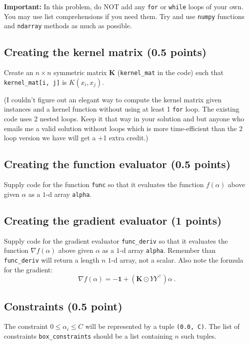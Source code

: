 \documentclass{article}
\begin{document}
{\bf Important:} In this problem, do NOT add any {\tt for} or {\tt while} loops of your own. You may use list comprehensions if you need them.
Try and use {\tt numpy} functions and {\tt ndarray} methods as much as possible.

\subsection{Creating the kernel matrix (0.5 points)}
Create an $n \times n$ symmetric matrix $\mathbf{K}$ ({\tt kernel\_mat} in the code) such that {\tt kernel\_mat[i, j]} is $K(x_i, x_j)$.

(I couldn't figure out an elegant way to compute the kernel matrix given instances and a kernel function without using at least 1 {\tt for}
loop. The existing code uses 2 nested loops. Keep it that way in your solution and but anyone who emails me a
valid solution without loops which is more time-efficient than the 2 loop version we have will get a +1 extra credit.)

\subsection{Creating the function evaluator (0.5 points)}

Supply code for the function {\tt func} so that it evaluates the function $f(\alpha)$ above given $\alpha$ as a $1$-d array {\tt alpha}.

\subsection{Creating the gradient evaluator (1 points)}

Supply code for the gradient evaluator {\tt func\_deriv} so that it evaluates the function $\nabla f(\alpha)$ above given $\alpha$ as a $1$-d array {\tt alpha}.
Remember than {\tt func\_deriv} will return a length $n$ $1$-d array, not a scalar. Also note the formula for the gradient:
$$
\nabla f(\alpha) = -\mathbf{1} + (\mathbf{K} \odot YY^\top) \alpha \ .
$$

\subsection{Constraints (0.5 point)}

The constraint $0 \leq \alpha_i \leq C$ will be represented by a tuple {\tt (0.0, C)}. The list of constraints {\tt box\_constraints} should be a list containing
$n$ such tuples.
\end{document}
